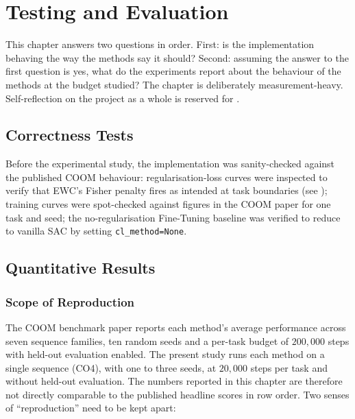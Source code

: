 \chapter{Testing and Evaluation}
\label{ch:eval}

This chapter answers two questions in order. First: is the
implementation behaving the way the methods say it should?
Second: assuming the answer to the first question is yes, what do
the experiments report about the behaviour of the methods at the
budget studied? The chapter is deliberately measurement-heavy.
Self-reflection on the project as a whole is reserved for
.

\section{Correctness Tests}
\label{sec:correctness}

Before the experimental study, the implementation was sanity-checked
against the published COOM behaviour: regularisation-loss curves were
inspected to verify that EWC's Fisher penalty fires as intended at task
boundaries (see ); training curves were spot-checked
against figures in the COOM paper for one task and seed; the
no-regularisation Fine-Tuning baseline was verified to reduce to vanilla
SAC by setting \texttt{cl\_method=None}.

\section{Quantitative Results}
\label{sec:results}

\subsection{Scope of Reproduction}
\label{sec:reproduction_scope}

The COOM benchmark paper \citep{tomilin2024coom} reports
each method's average performance across seven sequence
families, ten random seeds and a per-task budget of
$200{,}000$ steps with held-out evaluation enabled. The
present study runs each method on a single sequence (CO4),
with one to three seeds, at $20{,}000$ steps per task and
without held-out evaluation. The numbers reported in this
chapter are therefore not directly comparable to the
published headline scores in row order. Two senses of
``reproduction'' need to be kept apart:

